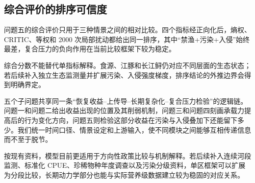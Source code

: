 \subsection{综合评价的排序可信度}
问题五的综合评价只用于三种情景之间的相对比较。四个指标经正向化后，熵权、CRITIC、等权和 2000 次局部扰动都给出同一排序，其中“禁渔+污染+入侵”始终最差，复合压力的负向作用在当前比较框架下较为稳定。

综合分数不能替代单指标解释。食源、江豚和长江鲟仍对应不同层面的生态状态；若后续补入独立生态监测量并扩展污染、入侵强度梯度，排序结论的外推边界会得到明确界定。

\noindent 五个子问题共享同一条“恢复收益--上传导--长期复杂化--复合压力检验”的逻辑链。问题一和问题二给出收益出现的位置及其削弱机制，问题三和问题四刻画承载力提高后的行为变化方向，问题五则检验这部分收益在污染与入侵叠加下还能留下多少。我们统一时间口径、情景设定和上游输入，使不同模块之间能够互相传递信息而不至于脱节。

\noindent 按现有资料，模型目前更适用于方向性政策比较与机制解释。若后续补入连续河段监测、标准化 CPUE、珍稀物种年度调查以及污染分级资料，单区框架可以扩展为分段比较，长期动力学部分也能与实际营养级数据建立较为稳固的对应关系。

